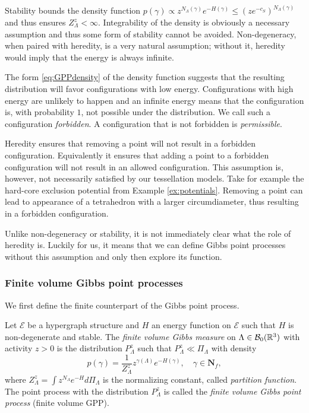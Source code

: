 Stability bounds the density function $p(\gamma) \propto z^{N_\Lambda( \gamma)}e^{-H(\gamma)} \leq (z e^{-c_S})^{N_\Lambda(\gamma)} $ and thus ensures $Z^z_\Lambda < \infty$. Integrability of the density is obviously a necessary assumption and thus some form of stability cannot be avoided. 
Non-degeneracy, when paired with heredity, is a very natural assumption; without it, heredity would imply that the energy is always infinite.\newline

The form \eqref{eq:GPPdensity} of the density function suggests that the resulting distribution will favor configurations with low energy. Configurations with high energy are unlikely to happen and an infinite energy means that the configuration is, with probability $1$, not possible under the distribution. We call such a configuration \textit{forbidden}. A configuration that is not forbidden is \textit{permissible}.  \newline

Heredity ensures that removing a point will not result in a forbidden configuration. Equivalently it ensures that adding a point to a forbidden configuration will not result in an allowed configuration. This assumption is, however, not necessarily satisfied by our tessellation models. Take for example the hard-core exclusion potential from Example \ref{ex:potentials}. Removing a point can lead to appearance of a tetrahedron with a larger circumdiameter, thus resulting in a forbidden configuration.\newline

Unlike non-degeneracy or stability, it is not immediately clear what the role of heredity is. Luckily for us, it means that we can define Gibbs point processes without this assumption and only then explore its function.



\subsubsection{Finite volume Gibbs point processes}
We first define the finite counterpart of the Gibbs point process.

\begin{definition}\label{def:fGPP}
	Let $\mathcal E$ be a hypergraph structure and $H$ an energy function on $\mathcal E$ such that $H$ is non-degenerate and stable. The \textit{finite volume Gibbs measure} on $\Lambda\in \mathcal B_0({\mathbb R^3})$ with activity $z>0$ is the distribution $P^z_\Lambda$ such that $P^z_\Lambda \ll \Pi_\Lambda$ with density
	$$p(\gamma) = \frac 1{Z^{z}_\Lambda} z^{\gamma(\Lambda)} e^{-H(\gamma)},\quad \gamma \in \mathbf N_f,$$
where  $Z^z_\Lambda = \int z^{N_\Lambda} e^{-H} d\Pi_\Lambda$ is the normalizing constant, called \textit{partition function}. \newline
The point process with the distribution $P^z_{\Lambda}$ is called the \textit{finite volume Gibbs point process} (finite volume GPP). 
\end{definition}

